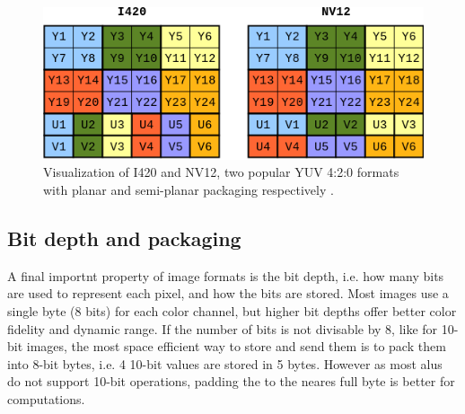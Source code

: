 \begin{figure}[H]
    \centering
    \includegraphics[width=.8\textwidth]{figures/debayer/YUV_packaging.png}
    \caption{Visualization of I420 and NV12, two popular YUV 4:2:0 formats with planar and semi-planar packaging respectively \cite{baranYUVFormats2018}.}
    \label{fig:image_packaging}
\end{figure}

\subsection{Bit depth and packaging}
A final importnt property of image formats is the bit depth, i.e.
how many bits are used to represent each pixel, and how the bits are stored.
Most images use a single byte (8 bits) for each color channel, but higher bit depths offer better color fidelity and dynamic range.
If the number of bits is not divisable by 8, like for 10-bit images, the most space efficient way to store and send them is to pack them into 8-bit bytes, i.e.
4 10-bit values are stored in 5 bytes.
However as most \glspl{alu} do not support 10-bit operations, padding the to the neares full byte is better for computations.